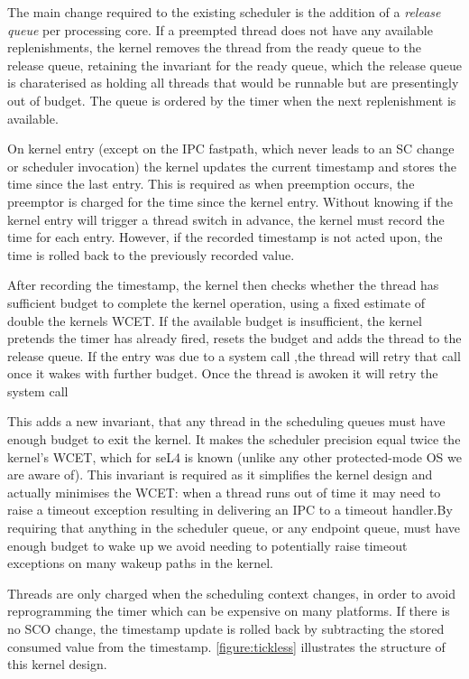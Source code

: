 The main change required to the existing scheduler is the addition of a \emph{release queue} per
processing core. If a
preempted thread does not have any available replenishments, the kernel removes the thread from the
ready queue to the release queue, retaining the invariant for the ready queue, which the release
queue is charaterised as holding all threads that would be runnable but are presentingly out of
budget. The queue is ordered by the timer when the next replenishment is available.

On kernel entry (except on the IPC fastpath, which never leads to an SC
change or scheduler invocation) the kernel updates the current
timestamp and stores the time since the last entry. This is required as when preemption occurs, the
preemptor is charged for the time since the kernel entry. Without knowing if the kernel entry will
trigger a thread switch in advance, the kernel must record the time for each entry. However, if the
recorded timestamp is not acted upon, the time is rolled back to the previously recorded value.

After recording the timestamp, the kernel then checks
whether the thread has sufficient budget to complete the kernel
operation, using a fixed estimate of double the kernels \gls{WCET}.
If the available budget is insufficient, the kernel pretends the timer has already fired,
resets the budget and adds the thread to the release queue. If the entry was due to a system call
,the thread will retry that call once it wakes with further budget.
Once the thread is awoken it will retry the system call

This adds a new
invariant, that any thread in the scheduling queues must have enough budget to exit the kernel.
It makes the scheduler precision equal twice the kernel's WCET, which for
seL4 is known (unlike any other protected-mode OS we are aware of).
This invariant is required as it simplifies the kernel design and actually minimises the WCET: when
a
thread runs out of time it may need to raise a timeout exception resulting in delivering an IPC to a
timeout handler.By requiring that anything in the scheduler queue, or any endpoint queue, must have
enough budget to wake up we avoid needing to potentially raise timeout exceptions on many wakeup
paths in the kernel.

Threads are only charged when the scheduling context changes, in order to avoid
reprogramming the timer which can be expensive on many platforms. %
If there is no \gls{SCO} change, the timestamp update is rolled back by subtracting the
stored consumed value from the timestamp.
\autoref{figure:tickless} illustrates the structure of this kernel design.

